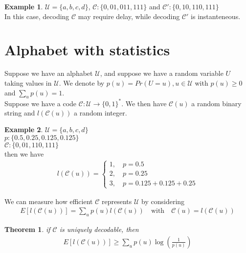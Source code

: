 \documentclass{article}
\newtheorem{theorem}{Theorem}[section]
\theoremstyle{definition} %
\newtheorem{example}{Example}
\def\U{\mathcal{U}}
\def\C{\mathscr{C}}
\begin{document}
\begin{example}
  $\U = \{a, b, c, d\}$, $\C: \{0, 01, 011, 111\}$ and $\C': \{0, 10, 110, 111\}$\\
  In this case, decoding $\C$ may require delay, while decoding $\C'$ is instanteneous.
\end{example}

\newpage
\section{Alphabet with statistics}

Suppose we have an alphabet $\U$, and suppose we have a random variable $U$ taking values in $\U$. We denote by $p(u) = Pr(U = u), u \in \U$ with $p(u) \geq 0$ and $\sum_u p(u) = 1$.\\

Suppose we have a code $\C: \U \rightarrow \{0, 1\}^*$. We then have $\C(u)$ a random binary string and $l(\C(u))$ a random integer.

\begin{example}
  $\U = \{a, b, c, d\}$\\
  $p: \{0.5, 0.25, 0.125, 0.125\}$ \\
  $\C: \{0, 01, 110, 111\}$ \\

  then we have
  \begin{align*}
    l(\C(u)) =
    \left\{
      \begin{array}{l}
        1, \quad p = 0.5 \\
        2, \quad p = 0.25 \\
        3, \quad p = 0.125 + 0.125 + 0.25
      \end{array}
    \right.
  \end{align*}
\end{example}

We can measure how efficient $\C$ represents $\U$ by considering
\begin{align*}
  E[l(\C(u))] = \sum_u p(u)l(\C(u)) \quad \text{with} \quad \C(u) = l(\C(u))
\end{align*}

\begin{theorem}
  if $\C$ is uniquely decodable, then
  \begin{align*}
    E[l(\C(u))] \geq \sum_u p(u) \log(\frac{1}{p(u)})
  \end{align*}
\end{theorem}
\end{document}
